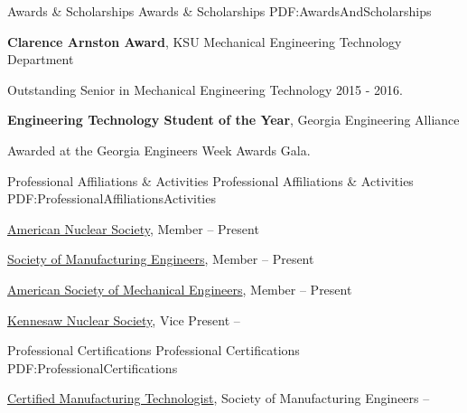 \documentclass[letterpaper,MMMyyyy,nonstopmode]{resume}
\begin{document}
\begin{Body}

\Section
{Awards \&\newline
Scholarships}
{Awards \& Scholarships}
{PDF:AwardsAndScholarships}

\Gap
\Entry
\textbf{Clarence Arnston Award},
KSU Mechanical Engineering Technology Department
\hfill
{}
\begin{Detail}
\SubBulletItem
Outstanding Senior in Mechanical Engineering Technology 2015 - 2016.
\end{Detail}

\Gap
\Entry
\textbf{Engineering Technology Student of the Year},
Georgia Engineering Alliance
\hfill
{}
\begin{Detail}
\SubBulletItem
Awarded at the Georgia Engineers Week Awards Gala.
\end{Detail}



\Section
{Professional Affiliations\newline
\& Activities}
{Professional Affiliations \& Activities}
{PDF:ProfessionalAffiliationsActivities}

\BulletItem
\href{http://www.ans.org/}
{American Nuclear Society},
Member
\hfill
{} -- Present

\BulletItem
\href{http://www.sme.org/}
{Society of Manufacturing Engineers},
Member
\hfill
{} -- Present

\BulletItem
\href{http://www.asme.org/}
{American Society of Mechanical Engineers},
Member
\hfill
{} -- Present

\BulletItem
\href{https://owllife.kennesaw.edu/organization/KNS}
{Kennesaw Nuclear Society},
Vice Present
\hfill
{} -- 



\Section
{Professional Certifications}
{Professional Certifications}
{PDF:ProfessionalCertifications}

\BulletItem
\href{http://www.sme.org/cmfgt/}
{Certified Manufacturing Technologist},
Society of Manufacturing Engineers
\hfill
{} --


\end{Body}
\end{document}

